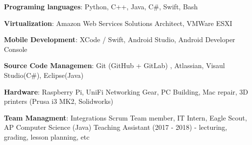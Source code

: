 

\begin{cventries}
\vspace{-5mm}
  \cventry
    {}
    {}
    {}
    {}
    {
      \begin{cvitems}
        \item {\textbf{Programing languages}: Python, C++, Java, C\#, Swift, Bash}
        \item {\textbf{Virtualization}: Amazon Web Services
            Solutions Architect, VMWare ESXI}
        \item {\textbf{Mobile Development}: XCode / Swift, Android
            Studio, Android Developer Console}
        \item {\textbf{Source Code Managemen}: Git (GitHub + GitLab) ,
            Atlassian, Visaul Studio(C\#), Eclipse(Java)}
        \item {\textbf{Hardware}: Raspberry Pi, UniFi Networking Gear,
            PC Building, Mac repair, 3D printers (Prusa i3 MK2,
            Solidworks)}
        \item {\textbf{Team Managment}:  Integrations Scrum Team
            member, IT Intern, Eagle Scout, AP Computer Science (Java) Teaching
            Assistant (2017 - 2018) - lecturing, grading, lesson
            planning, etc}
      \end{cvitems}
    }
\end{cventries}